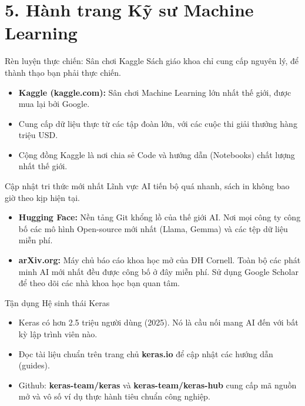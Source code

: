 \documentclass[aspectratio=169]{beamer}
\begin{document}
\section{5. Hành trang Kỹ sư Machine Learning}

\begin{frame}{Rèn luyện thực chiến: Sân chơi Kaggle}
    Sách giáo khoa chỉ cung cấp nguyên lý, để thành thạo bạn phải thực chiến.
    \begin{itemize}
        \item \textbf{Kaggle (kaggle.com):} Sân chơi Machine Learning lớn nhất thế giới, được mua lại bởi Google.
        \item Cung cấp dữ liệu thực từ các tập đoàn lớn, với các cuộc thi giải thưởng hàng triệu USD.
        \item Cộng đồng Kaggle là nơi chia sẻ Code và hướng dẫn (Notebooks) chất lượng nhất thế giới.
    \end{itemize}
\end{frame}

\begin{frame}{Cập nhật tri thức mới nhất}
    Lĩnh vực AI tiến bộ quá nhanh, sách in không bao giờ theo kịp hiện tại.
    \begin{itemize}
        \item \textbf{Hugging Face:} Nền tảng Git khổng lồ của thế giới AI. Nơi mọi công ty công bố các mô hình Open-source mới nhất (Llama, Gemma) và các tệp dữ liệu miễn phí.
        \item \textbf{arXiv.org:} Máy chủ báo cáo khoa học mở của ĐH Cornell. Toàn bộ các phát minh AI mới nhất đều được công bố ở đây miễn phí. Sử dụng Google Scholar để theo dõi các nhà khoa học bạn quan tâm.
    \end{itemize}
\end{frame}

\begin{frame}{Tận dụng Hệ sinh thái Keras}
    \begin{itemize}
        \item Keras có hơn 2.5 triệu người dùng (2025). Nó là cầu nối mang AI đến với bất kỳ lập trình viên nào.
        \item Đọc tài liệu chuẩn trên trang chủ \textbf{keras.io} để cập nhật các hướng dẫn (guides).
        \item Github: \textbf{keras-team/keras} và \textbf{keras-team/keras-hub} cung cấp mã nguồn mở và vô số ví dụ thực hành tiêu chuẩn công nghiệp.
    \end{itemize}
\end{frame}
\end{document}
